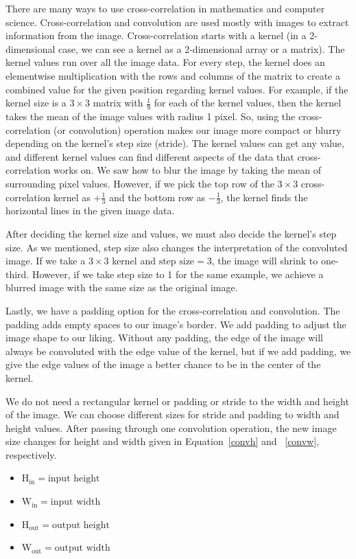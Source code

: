 There are many ways to use cross-correlation in mathematics and computer science. Cross-correlation and convolution are used mostly with images to extract information from the image. Cross-correlation starts with a kernel (in a 2-dimensional case, we can see a kernel as a 2-dimensional array or a matrix). The kernel values run over all the image data. For every step, the kernel does an elementwise multiplication with the rows and columns of the matrix to create a combined value for the given position regarding kernel values. For example, if the kernel size is a $3 \times 3$ matrix with $\frac{1}{9}$ for each of the kernel values, then the kernel takes the mean of the image values with radius 1 pixel. So, using the cross-correlation (or convolution) operation makes our image more compact or blurry depending on the kernel’s step size (stride). The kernel values can get any value, and different kernel values can find different aspects of the data that cross-correlation works on. We saw how to blur the image by taking the mean of surrounding pixel values. However, if we pick the top row of the $3 \times 3$ cross-correlation kernel as $+\frac{1}{3}$ and the bottom row as $-\frac{1}{3}$, the kernel finds the horizontal lines in the given image data.

After deciding the kernel size and values, we must also decide the kernel’s step size. As we mentioned, step size also changes the interpretation of the convoluted image. If we take a $3 \times 3$ kernel and $\text{step size} = 3$, the image will shrink to one-third. However, if we take step size to 1 for the same example, we achieve a blurred image with the same size as the original image.

Lastly, we have a padding option for the cross-correlation and convolution. The padding adds empty spaces to our image’s border. We add padding to adjust the image shape to our liking. Without any padding, the edge of the image will always be convoluted with the edge value of the kernel, but if we add padding, we give the edge values of the image a better chance to be in the center of the kernel.

We do not need a rectangular kernel or padding or stride to the width and height of the image. We can choose different sizes for stride and padding to width and height values. After passing through one convolution operation, the new image size changes for height and width given in Equation~\eqref{convh} and ~\eqref{convw}, respectively.

\begin{itemize}
\item $\text{H}_{\text{in}} = \text{input height}$

\item $\text{W}_{\text{in}} = \text{input width}$

\item $\text{H}_{\text{out}} = \text{output height}$

\item $\text{W}_{\text{out}} = \text{output width}$
\end{itemize}

